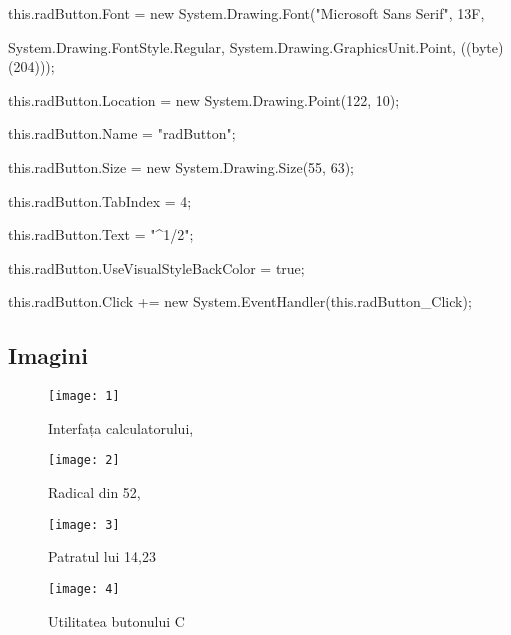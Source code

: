     this.radButton.Font = new System.Drawing.Font("Microsoft Sans Serif", 13F, 	
    
    System.Drawing.FontStyle.Regular, System.Drawing.GraphicsUnit.Point, ((byte)(204)));
    
    this.radButton.Location = new System.Drawing.Point(122, 10);
    
    this.radButton.Name = "radButton";
    
    this.radButton.Size = new System.Drawing.Size(55, 63);
    
    this.radButton.TabIndex = 4;
    
    this.radButton.Text = "^1/2";
    
    this.radButton.UseVisualStyleBackColor = true;
    
    this.radButton.Click += new System.EventHandler(this.radButton_Click);
    
\subsection{Imagini}

\begin{figure}[!ht]
\centering
\texttt{[image: 1]}
\caption{Interfața calculatorului, \cite{ImRef}}
\label{Im_label}
\end{figure}

\begin{figure}[!ht]
\centering
\texttt{[image: 2]}
\caption{Radical din 52, \cite{ImRef}}
\label{Im_label}
\end{figure}

\begin{figure}[!ht]
\centering
\texttt{[image: 3]}
\caption{Patratul lui 14,23 \cite{ImRef}}
\label{Im_label}
\end{figure}


\begin{figure}[!ht]
\centering
\texttt{[image: 4]}
\caption{Utilitatea butonului C \cite{ImRef}}
\label{Im_label}
\end{figure}

\clearpage